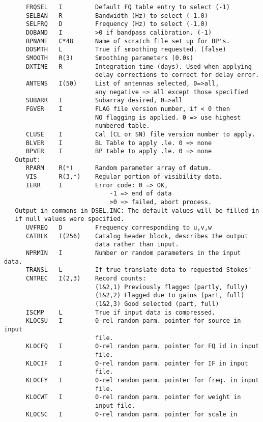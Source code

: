 \begin{verbatim}
      FRQSEL   I         Default FQ table entry to select (-1)
      SELBAN   R         Bandwidth (Hz) to select (-1.0)
      SELFRQ   D         Frequency (Hz) to select (-1.0)
      DOBAND   I         >0 if bandpass calibration. (-1)
      BPNAME   C*48      Name of scratch file set up for BP's.
      DOSMTH   L         True if smoothing requested. (false)
      SMOOTH   R(3)      Smoothing parameters (0.0s)
      DXTIME   R         Integration time (days). Used when applying
                         delay corrections to correct for delay error.
      ANTENS   I(50)     List of antennas selected, 0=>all,
                         any negative => all except those specified
      SUBARR   I         Subarray desired, 0=>all
      FGVER    I         FLAG file version number, if < 0 then
                         NO flagging is applied. 0 => use highest
                         numbered table.
      CLUSE    I         Cal (CL or SN) file version number to apply.
      BLVER    I         BL Table to apply .le. 0 => none
      BPVER    I         BP table to apply .le. 0 => none
   Output:
      RPARM    R(*)      Random parameter array of datum.
      VIS      R(3,*)    Regular portion of visibility data.
      IERR     I         Error code: 0 => OK,
                             -1 => end of data
                             >0 => failed, abort process.
   Output in commons in DSEL.INC: The default values will be filled in
   if null values were specified.
      UVFREQ   D         Frequency corresponding to u,v,w
      CATBLK   I(256)    Catalog header block, describes the output
                         data rather than input.
      NPRMIN   I         Number or random parameters in the input data.
      TRANSL   L         If true translate data to requested Stokes'
      CNTREC   I(2,3)    Record counts:
                         (1&2,1) Previously flagged (partly, fully)
                         (1&2,2) Flagged due to gains (part, full)
                         (1&2,3) Good selected (part, full)
      ISCMP    L         True if input data is compressed.
      KLOCSU   I         0-rel random parm. pointer for source in input
                         file.
      KLOCFQ   I         0-rel random parm. pointer for FQ id in input
                         file.
      KLOCIF   I         0-rel random parm. pointer for IF in input
                         file.
      KLOCFY   I         0-rel random parm. pointer for freq. in input
                         file.
      KLOCWT   I         0-rel random parm. pointer for weight in
                         input file.
      KLOCSC   I         0-rel random parm. pointer for scale in

\end{verbatim}
